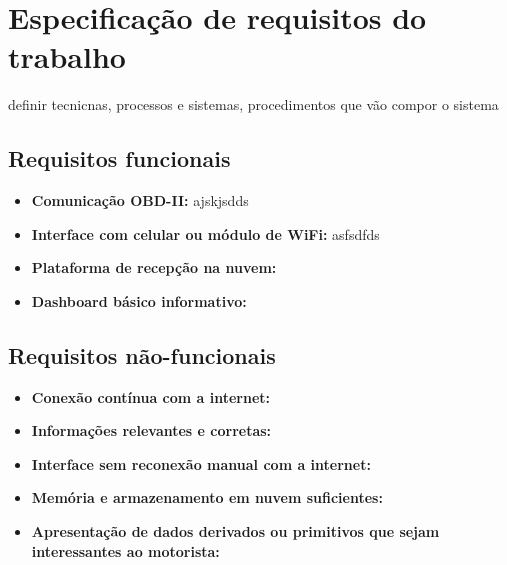 \chapter{Especificação de requisitos do trabalho}

\label{CAP4}


definir tecnicnas, processos e sistemas, procedimentos que vão compor o sistema


\section{Requisitos funcionais}
\begin{itemize}
    \item \textbf{Comunicação OBD-II:} ajskjsdds
    \item \textbf{Interface com celular ou módulo de WiFi:} asfsdfds
    \item \textbf{Plataforma de recepção na nuvem:}
    \item \textbf{Dashboard básico informativo:}
\end{itemize}

\section{Requisitos não-funcionais}

\begin{itemize}
    \item \textbf{Conexão contínua com a internet:}
    \item \textbf{Informações relevantes e corretas:}
    \item \textbf{Interface sem reconexão manual com a internet:}
    \item \textbf{Memória e armazenamento em nuvem suficientes:}
    \item \textbf{Apresentação de dados derivados ou primitivos que sejam interessantes ao motorista:}
\end{itemize}



